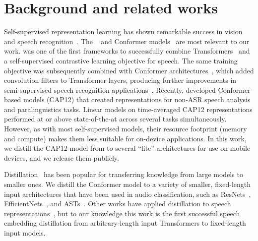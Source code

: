 \section{Background and related works}
\label{sec:related}
Self-supervised representation learning has shown remarkable success in vision~\cite{simclr} and speech
recognition~\cite{baevski2020wav2vec}. The \wavvec~\cite{baevski2020wav2vec} and Conformer models~\cite{conformer} are most relevant to our work. %
\cite{baevski2020wav2vec} was one of the first frameworks to successfully combine Transformers~\cite{transformer} and a self-supervised contrastive learning objective for speech. The same training objective was subsequently combined with Conformer architectures~\cite{conformer}, which added convolution filters to Transformer layers, producing further improvements in semi-supervised speech recognition applications~\cite{bigssl}. Recently,  \cite{cap12} developed Conformer-based models (CAP12) that created representations for
non-ASR speech analysis and paralinguistics tasks. Linear models on time-averaged CAP12 representations performed at or above state-of-the-at across several tasks simultaneously. However, as with most self-supervised models, their resource footprint (memory and compute) makes them less suitable for on-device applications. In this work, we distill the CAP12 model from \cite{cap12} to several ``lite'' architectures for use on mobile devices, and we release them publicly.

Distillation~\cite{distillation} has been popular for transferring knowledge from large models to smaller ones. We distill the Conformer model to a variety of smaller, fixed-length input architectures that have been used in audio classification, such as ResNets~\cite{hershey2017cnn}, EfficientNets~\cite{efficientnetv2}, and ASTs~\cite{ast}. Other works have applied distillation to speech representations~\cite{frill}, but to our knowledge this work is the first successful speech embedding distillation from arbitrary-length input Transformers to fixed-length input models.